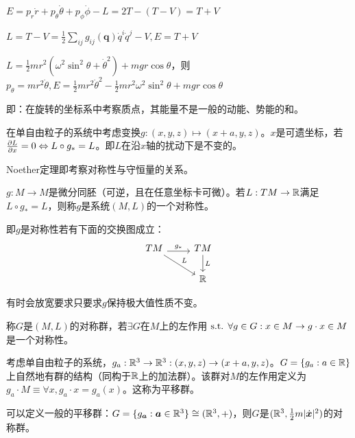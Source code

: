 \documentclass{ctexbook}
\begin{document}
\begin{Eg}[中心势的能量]
  $E=p_{r}\dot{r}+p_{\theta}\dot{\theta}+p_{\phi}\dot{\phi}-L=2T-(T-V)=T+V$
\end{Eg}

\begin{Eg}[自然系统]
  $L=T-V=\frac{1}{2}\sum_{ij}g_{ij}(\bm{q})\dot q^{i}\dot q^{j}-V, E=T+V$
\end{Eg}

\begin{Eg}[旋转圆环上的自由球]
  $L=\frac{1}{2}mr^{2}(\omega^{2}\sin^{2}\theta+\dot\theta^{2})+mgr\cos\theta$，则$p_{\theta}=mr^{2}\dot{\theta},E=\frac{1}{2}mr^{2}\dot\theta^{2}-\frac{1}{2}mr^{2}\omega^{2}\sin^{2}\theta+mgr\cos\theta$

  即：在旋转的坐标系中考察质点，其能量不是一般的动能、势能的和。
\end{Eg}

在单自由粒子的系统中考虑变换$g:(x,y,z)\mapsto (x+a,y,z)$。$x$是可遗坐标，若$\frac{\partial L}{\partial x}=0\Leftrightarrow L\circ g_{*}=L$。即$L$在沿$x$轴的扰动下是不变的。

Noether定理即考察对称性与守恒量的关系。

\begin{Def}[对称性]
  $g:M\to M$是微分同胚（可逆，且在任意坐标卡可微）。若$L:TM\to \mathbb{R}$满足$L\circ g_{*}=L$，则称$g$是系统$(M,L)$的一个对称性。
\end{Def}
即$g$是对称性若有下面的交换图成立：
\[
\begin{tikzcd}
TM \arrow[r, "g_*", shift right] \arrow[rd, "L"] & TM \arrow[d, "L"] \\
                                                 & \mathbb{R}       
\end{tikzcd}
\]

有时会放宽要求只要求$g$保持极大值性质不变。

\begin{Def}[对称群]
  称$G$是$(M,L)$的对称群，若$\exists G$在$M$上的左作用$\text{ s.t. }\forall g\in G: x\in M\to g\cdot x\in M$是一个对称性。
\end{Def}

\begin{Eg}
  考虑单自由粒子的系统，$g_{a}:\mathbb{R}^{3}\to \mathbb{R}^{3}:(x,y,z)\to (x+a,y,z)$。$G=\{g_{a}:a\in\mathbb{R}\}$上自然地有群的结构（同构于$\mathbb{R}$上的加法群）。该群对$M$的左作用定义为$g_{a}\cdot M\equiv \forall x, g_{a}\cdot x=g_{a}(x)$。这称为平移群。

  可以定义一般的平移群：$G=\{g_{\bm a}:\bm{a}\in\mathbb{R}^{3}\}\cong (\mathbb{R}^{3},+)$，则$G$是$(\mathbb{R}^{3},\frac{1}{2}m|\dot{\bm x}|^{2})$的对称群。
\end{Eg}
\end{document}
